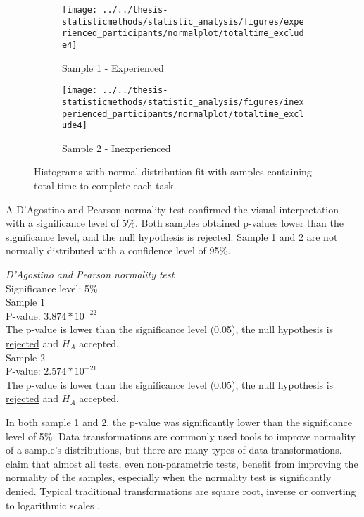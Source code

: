 \begin{figure}[H]
	\centering
	\begin{subfigure}[b]{0.48\textwidth}
		\centering
		\texttt{[image: ../../thesis-statisticmethods/statistic\_analysis/figures/experienced\_participants/normalplot/totaltime\_exclude4]}
		\caption{Sample 1 - Experienced}
		\label{fig:totaltimeexclude4_experienced}
	\end{subfigure}
	\begin{subfigure}[b]{0.48\textwidth}
		\centering
		\texttt{[image: ../../thesis-statisticmethods/statistic\_analysis/figures/inexperienced\_participants/normalplot/totaltime\_exclude4]}
		\caption{Sample 2 - Inexperienced}
		\label{fig:totaltimeexclude4_inexperienced}
	\end{subfigure}
\caption{Histograms with normal distribution fit with samples containing total time to complete each task}
\label{fig:sample1,2_histo_original}
\end{figure}

A D'Agostino and Pearson normality test confirmed the visual interpretation with a significance level of 5\%. Both samples obtained p-values lower than the significance level, and the null hypothesis is rejected. Sample 1 and 2 are not normally distributed with a confidence level of 95\%. \\[0.5cm]

\begin{center}
	\begin{tcolorbox}[width=0.80\textwidth]
		\centering
				\textit{D'Agostino and Pearson normality test}\\
				Significance level: 5\%  \\[0.5cm]
	
				Sample 1\\
				P-value: $3.874 * 10^{-22}$\\
				The p-value is lower than the significance level (0.05), the null hypothesis is \underline{rejected} and $H_A$ accepted.\\[0.5cm]
				
				Sample 2\\
				P-value: $2.574 * 10^{-21}$ \\
				The p-value is lower than the significance level (0.05), the null hypothesis is \underline{rejected} and $H_A$ accepted.\\[0.5cm]
	\end{tcolorbox} 
\end{center}
In both sample 1 and 2, the p-value was significantly lower than the significance level of 5\%. Data transformations are commonly used tools to improve normality of a sample's distributions, but there are many types of data transformations. \cite{Osborne2010} claim that almost all tests, even non-parametric tests, benefit from improving the normality of the samples, especially when the normality test is significantly denied. Typical traditional transformations are square root, inverse or converting to logarithmic scales  \citep{Osborne2010}. 

